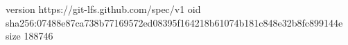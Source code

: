 version https://git-lfs.github.com/spec/v1
oid sha256:07488e87ca738b77169572ed08395f164218b61074b181c848e32b8fc899144e
size 188746

